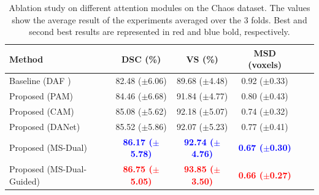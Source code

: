 \documentclass[journal]{IEEEtran}
\begin{document}
\begin{table}[ht!]
\centering
\scriptsize
\begin{tabular}{lcccc|c}\\
\toprule
Method & \textbf{DSC (\%)} & \textbf{VS (\%)} & \textbf{MSD (voxels)}  \\
\midrule
Baseline (DAF \cite{wang18d})  &  82.48 ($\pm$6.06) &   89.68 ($\pm$4.48) &  0.92 ($\pm$0.33)
\\
Proposed (PAM)  & 84.46 ($\pm$6.68) &  91.84 ($\pm$4.77) &  0.80 ($\pm$0.43) \\
Proposed (CAM)  & 85.08 ($\pm$5.62) & 92.18 ($\pm$5.07) & 0.74 ($\pm$0.32)\\
Proposed (DANet) &  85.52 ($\pm$5.86) &  92.07 ($\pm$5.23) &   0.77 ($\pm$0.41)      \\
Proposed (MS-Dual) &  \textcolor{blue}{\textbf{86.17 ($\pm$5.78)}} & \textcolor{blue}{\textbf{92.74 ($\pm$4.76)}} &  \textcolor{blue}{\textbf{0.67 ($\pm$0.30)}}\\
Proposed (MS-Dual-Guided)  &  \textcolor{red}{\textbf{86.75 ($\pm$5.05)}} & \textcolor{red}{\textbf{93.85 ($\pm$3.50)}} &  \textcolor{red}{\textbf{0.66 ($\pm$0.27)}}\\

\midrule
\end{tabular}
\caption{Ablation study on different attention modules on the Chaos dataset. The values show the average result of the experiments averaged over the 3 folds. Best and second best results are represented in red and blue bold, respectively.}
\label{table:metrics_ablation}
\end{table}
\end{document}
